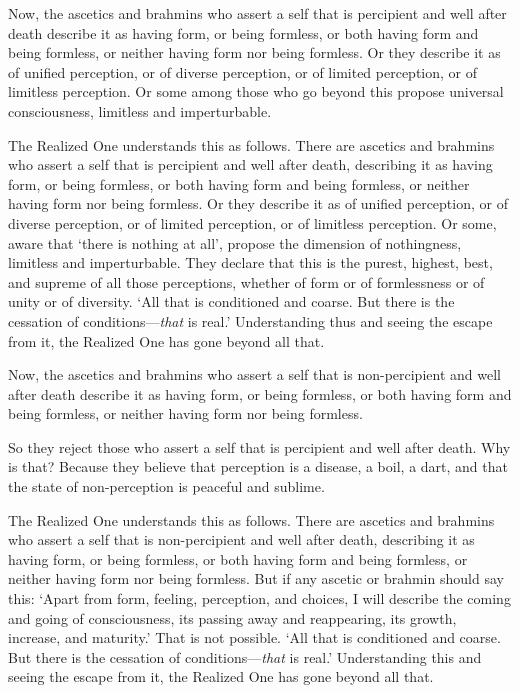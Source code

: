 \documentclass[12pt,openany]{book}%
\begin{document}
Now, the ascetics and brahmins who assert a self that is percipient and well after death describe it as having form, or being formless, or both having form and being formless, or neither having form nor being formless. Or they describe it as of unified perception, or of diverse perception, or of limited perception, or of limitless perception. Or some among those who go beyond this propose universal consciousness, limitless and imperturbable. 

The Realized One understands this as follows. There are ascetics and brahmins who assert a self that is percipient and well after death, describing it as having form, or being formless, or both having form and being formless, or neither having form nor being formless. Or they describe it as of unified perception, or of diverse perception, or of limited perception, or of limitless perception. Or some, aware that ‘there is nothing at all’, propose the dimension of nothingness, limitless and imperturbable. They declare that this is the purest, highest, best, and supreme of all those perceptions, whether of form or of formlessness or of unity or of diversity. ‘All that is conditioned and coarse. But there is the cessation of conditions—\emph{that} is real.’ Understanding thus and seeing the escape from it, the Realized One has gone beyond all that. 

Now, the ascetics and brahmins who assert a self that is non-percipient and well after death describe it as having form, or being formless, or both having form and being formless, or neither having form nor being formless. 

So they reject those who assert a self that is percipient and well after death. Why is that? Because they believe that perception is a disease, a boil, a dart, and that the state of non-perception is peaceful and sublime. 

The Realized One understands this as follows. There are ascetics and brahmins who assert a self that is non-percipient and well after death, describing it as having form, or being formless, or both having form and being formless, or neither having form nor being formless. But if any ascetic or brahmin should say this: ‘Apart from form, feeling, perception, and choices, I will describe the coming and going of consciousness, its passing away and reappearing, its growth, increase, and maturity.’ That is not possible. ‘All that is conditioned and coarse. But there is the cessation of conditions—\emph{that} is real.’ Understanding this and seeing the escape from it, the Realized One has gone beyond all that. 
\end{document}
